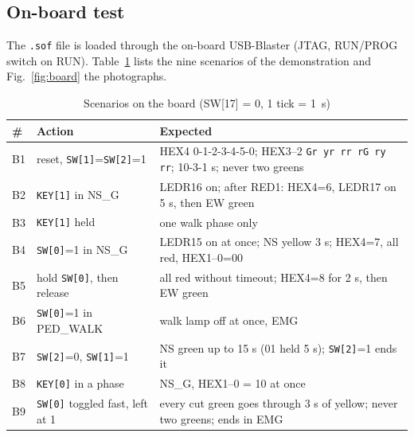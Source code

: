 \documentclass[conference]{IEEEtran}
\newif\ifdraftmarks
\newcommand{\verify}[1]{\ifdraftmarks\,\textcolor{red}{\textbf{[#1]}}\fi}
\newcommand{\code}[1]{\texttt{\upshape #1}}
\newcommand{\st}[1]{\textsf{#1}}         %
\begin{document}
\subsection{On-board test}
The \code{.sof} file is loaded through the on-board USB-Blaster (JTAG, RUN/PROG
switch on RUN). Table~\ref{tab:board} lists the nine scenarios of the
demonstration and Fig.~\ref{fig:board} the photographs.\verify{V2}

\begin{table}[t]
\centering
\caption{Scenarios on the board (SW[17] = 0, 1 tick = 1~s)}
\label{tab:board}
\scriptsize
\setlength{\tabcolsep}{2.5pt}
\begin{tabular}{@{}l p{2.35cm} p{4.6cm}@{}}
\toprule
\# & Action & Expected \\
\midrule
B1 & reset, \code{SW[1]}=\code{SW[2]}=1 & HEX4 0-1-2-3-4-5-0; HEX3--2 \code{Gr yr rr rG ry rr}; 10-3-1 s; never two greens \\
B2 & \code{KEY[1]} in \st{NS\_G} & LEDR16 on; after \st{RED1}: HEX4=6, LEDR17 on 5 s, then EW green \\
B3 & \code{KEY[1]} held & one walk phase only \\
B4 & \code{SW[0]}=1 in \st{NS\_G} & LEDR15 on at once; NS yellow 3 s; HEX4=7, all red, HEX1--0=00 \\
B5 & hold \code{SW[0]}, then release & all red without timeout; HEX4=8 for 2 s, then EW green \\
B6 & \code{SW[0]}=1 in \st{PED\_WALK} & walk lamp off at once, \st{EMG} \\
B7 & \code{SW[2]}=0, \code{SW[1]}=1 & NS green up to 15 s (01 held 5 s); \code{SW[2]}=1 ends it \\
B8 & \code{KEY[0]} in a phase & \st{NS\_G}, HEX1--0 = 10 at once \\
B9 & \code{SW[0]} toggled fast, left at 1 & every cut green goes through 3 s of yellow; never two greens; ends in \st{EMG} \\
\bottomrule
\end{tabular}
\end{table}
\end{document}
